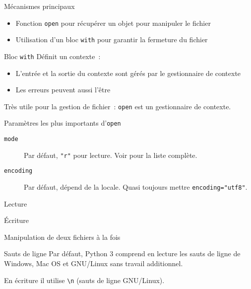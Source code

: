 \begin{frame}{Mécanismes principaux}
  \begin{itemize}
    \item Fonction \texttt{open} pour récupérer un objet pour manipuler le fichier
    \item Utilisation d'un bloc \texttt{with} pour garantir la fermeture du fichier
  \end{itemize}
\end{frame}

\begin{frame}{Bloc \texttt{with}}
  Définit un contexte~:
  \begin{itemize}
    \item L'entrée et la sortie du contexte sont gérés par le gestionnaire de contexte
    \item Les erreurs peuvent aussi l'être
  \end{itemize}

  Très utile pour la gestion de fichier~: \texttt{open} est un gestionnaire de contexte.
\end{frame}

\begin{frame}{Paramètres les plus importants d'\texttt{open}}
  \begin{description}
    \item[\texttt{mode}] Par défaut, \texttt{"r"} pour lecture. Voir  pour la liste complète.
    \item[\texttt{encoding}] Par défaut, dépend de la locale. Quasi toujours mettre \texttt{encoding="utf8"}.
  \end{description}
\end{frame}

\begin{frame}{Lecture}
\end{frame}

\begin{frame}{Écriture}
\end{frame}

\begin{frame}{Manipulation de deux fichiers à la fois}
\end{frame}

\begin{frame}{Sauts de ligne}
  Par défaut, Python 3 comprend en lecture les sauts de ligne de Windows, Mac OS et GNU/Linux sans travail additionnel.

  En écriture il utilise \texttt{\textbackslash n} (sauts de ligne GNU/Linux).
\end{frame}

